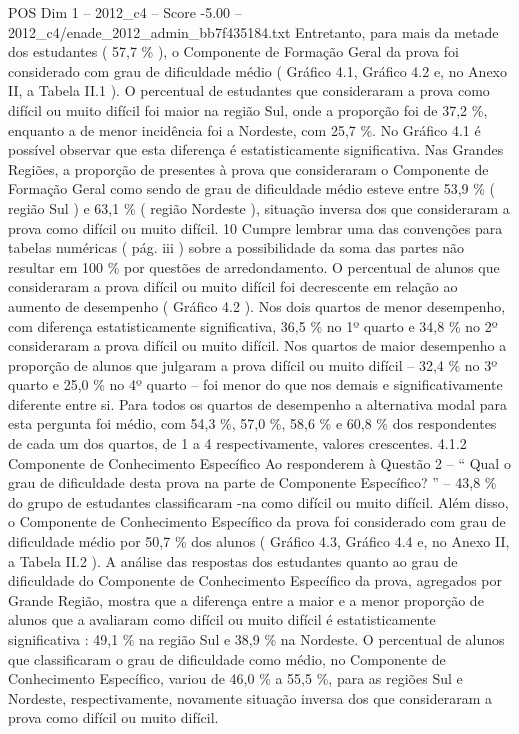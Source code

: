 \begin{textsample}{POS Dim 1 – 2012\_c4 – Score -5.00 – 2012\_c4/enade\_2012\_admin\_bb7f435184.txt}
Entretanto, para mais da metade dos estudantes ( 57,7 \% ), o Componente de Formação Geral da prova foi considerado com grau de dificuldade médio ( Gráfico 4.1, Gráfico 4.2 e, no Anexo II, a Tabela II.1 ).
O percentual de estudantes que consideraram a prova como difícil ou muito difícil foi maior na região Sul, onde a proporção foi de 37,2 \%, enquanto a de menor incidência foi a Nordeste, com 25,7 \%.
No Gráfico 4.1 é possível observar que esta diferença é estatisticamente significativa.
Nas Grandes Regiões, a proporção de presentes à prova que consideraram o Componente de Formação Geral como sendo de grau de dificuldade médio esteve entre 53,9 \% ( região Sul ) e 63,1 \% ( região Nordeste ), situação inversa dos que consideraram a prova como difícil ou muito difícil. 10 Cumpre lembrar uma das convenções para tabelas numéricas ( pág. iii ) sobre a possibilidade da soma das partes não resultar em 100 \% por questões de arredondamento.
O percentual de alunos que consideraram a prova difícil ou muito difícil foi decrescente em relação ao aumento de desempenho ( Gráfico 4.2 ).
Nos dois quartos de menor desempenho, com diferença estatisticamente significativa, 36,5 \% no 1º quarto e 34,8 \% no 2º consideraram a prova difícil ou muito difícil.
Nos quartos de maior desempenho a proporção de alunos que julgaram a prova difícil ou muito difícil – 32,4 \% no 3º quarto e 25,0 \% no 4º quarto – foi menor do que nos demais e significativamente diferente entre si.
Para todos os quartos de desempenho a alternativa modal para esta pergunta foi médio, com 54,3 \%, 57,0 \%, 58,6 \% e 60,8 \% dos respondentes de cada um dos quartos, de 1 a 4 respectivamente, valores crescentes. 4.1.2 Componente de Conhecimento Específico Ao responderem à Questão 2 – “ Qual o grau de dificuldade desta prova na parte de Componente Específico? ” – 43,8 \% do grupo de estudantes classificaram -na como difícil ou muito difícil.
Além disso, o Componente de Conhecimento Específico da prova foi considerado com grau de dificuldade médio por 50,7 \% dos alunos ( Gráfico 4.3, Gráfico 4.4 e, no Anexo II, a Tabela II.2 ).
A análise das respostas dos estudantes quanto ao grau de dificuldade do Componente de Conhecimento Específico da prova, agregados por Grande Região, mostra que a diferença entre a maior e a menor proporção de alunos que a avaliaram como difícil ou muito difícil é estatisticamente significativa : 49,1 \% na região Sul e 38,9 \% na Nordeste.
O percentual de alunos que classificaram o grau de dificuldade como médio, no Componente de Conhecimento Específico, variou de 46,0 \% a 55,5 \%, para as regiões Sul e Nordeste, respectivamente, novamente situação inversa dos que consideraram a prova como difícil ou muito difícil.

\end{textsample}
